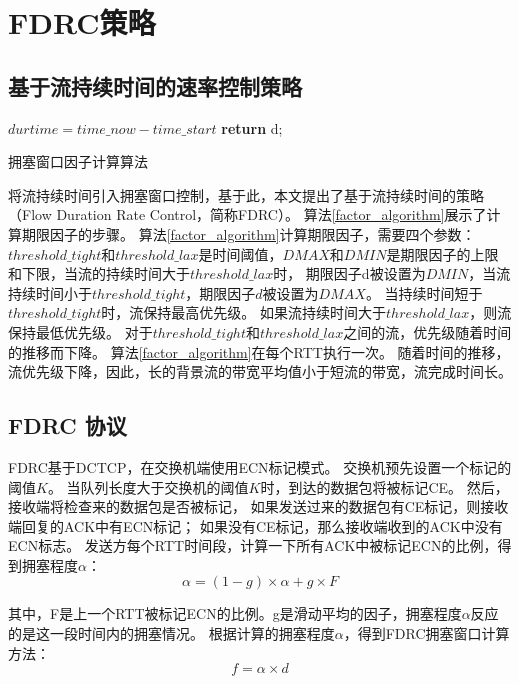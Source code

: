 \section{FDRC策略}

\subsection{基于流持续时间的速率控制策略}

\begin{algorithm}
 $durtime=time\_now-time\_start$\;
   \textbf{return} d;
\caption{拥塞窗口因子计算算法}
\label{factor_algorithm}
\end{algorithm}

将流持续时间引入拥塞窗口控制，基于此，本文提出了基于流持续时间的策略（Flow Duration Rate Control，简称FDRC）。
算法\ref{factor_algorithm}展示了计算期限因子的步骤。
算法\ref{factor_algorithm}计算期限因子，需要四个参数： 
$threshold\_tight$和$threshold\_lax$是时间阈值，$DMAX$和$DMIN$是期限因子的上限和下限，当流的持续时间大于$threshold\_lax$时，
期限因子d被设置为$DMIN$，当流持续时间小于$threshold\_tight$，期限因子$d$被设置为$DMAX$。
当持续时间短于$threshold\_tight$时，流保持最高优先级。
如果流持续时间大于$threshold\_lax$，则流保持最低优先级。
对于$threshold\_tight$和$threshold\_lax$之间的流，优先级随着时间的推移而下降。
算法\ref{factor_algorithm}在每个RTT执行一次。
随着时间的推移，流优先级下降，因此，长的背景流的带宽平均值小于短流的带宽，流完成时间长。

\subsection{FDRC 协议}
FDRC基于DCTCP，在交换机端使用ECN标记模式。
交换机预先设置一个标记的阈值$K$。
当队列长度大于交换机的阈值$K$时，到达的数据包将被标记CE。
然后，接收端将检查来的数据包是否被标记，
如果发送过来的数据包有CE标记，则接收端回复的ACK中有ECN标记；
如果没有CE标记，那么接收端收到的ACK中没有ECN标志。
发送方每个RTT时间段，计算一下所有ACK中被标记ECN的比例，得到拥塞程度$\alpha$：
\begin{equation}
\label{alpha}
\alpha=(1-g) \times \alpha+g\times F
\end{equation}

其中，F是上一个RTT被标记ECN的比例。g是滑动平均的因子，拥塞程度$\alpha$反应的是这一段时间内的拥塞情况。
 根据计算的拥塞程度$\alpha$，得到FDRC拥塞窗口计算方法：
\begin{equation}
\label{factor}
f=\alpha \times d
\end{equation}

